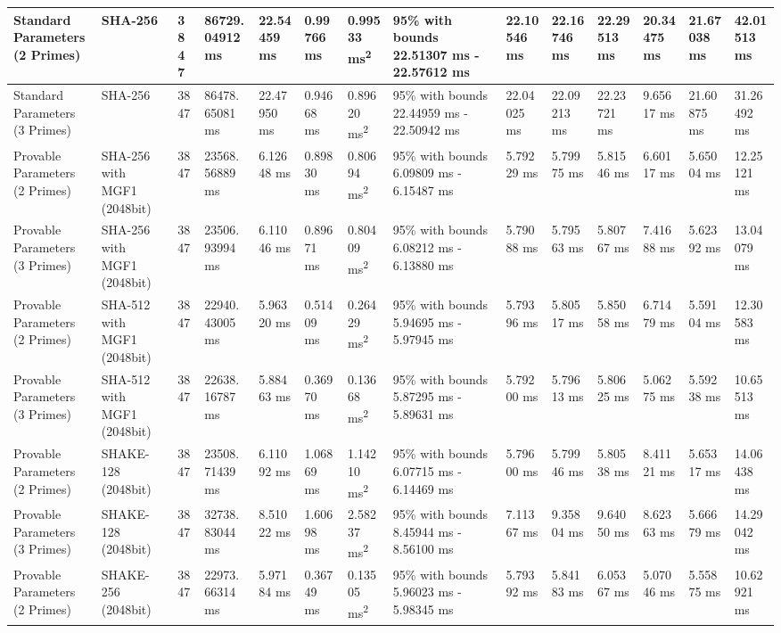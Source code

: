 \documentclass[]{final_report}
\theoremstyle{definition}
\begin{document}
\begin{landscape}
\begin{longtable}{|p{2.3cm}|p{1.8cm}|p{1.0cm}|p{1.7cm}|p{1.4cm}|p{1.5cm}|p{1.8cm}|p{1.5cm}|p{1.43cm}|p{1.5cm}|p{1.3cm}|p{1.4cm}|p{1.3cm}|p{1.3cm}|}
\hline
\endlastfoot
Standard Parameters (2 Primes) & SHA-256 & 3847 & 86729.
04912 ms & 22.54459 ms & 0.99766 ms & 0.99533 ms\textsuperscript{2} & 95\% with bounds 22.51307 ms - 22.57612 ms & 22.10546 ms & 22.16746 ms & 22.29513 ms & 20.34475 ms & 21.67038 ms & 42.01513 ms \\
\hline
Standard Parameters (3 Primes) & SHA-256 & 3847 & 86478.
65081 ms & 22.47950 ms & 0.94668 ms & 0.89620 ms\textsuperscript{2} & 95\% with bounds 22.44959 ms - 22.50942 ms & 22.04025 ms & 22.09213 ms & 22.23721 ms & 9.65617 ms & 21.60875 ms & 31.26492 ms \\
\hline
Provable Parameters (2 Primes) & SHA-256 with MGF1 (2048bit) & 3847 & 23568.
56889 ms & 6.12648 ms & 0.89830 ms & 0.80694 ms\textsuperscript{2} & 95\% with bounds 6.09809 ms - 6.15487 ms & 5.79229 ms & 5.79975 ms & 5.81546 ms & 6.60117 ms & 5.65004 ms & 12.25121 ms \\
\hline
Provable Parameters (3 Primes) & SHA-256 with MGF1 (2048bit) & 3847 & 23506.
93994 ms & 6.11046 ms & 0.89671 ms & 0.80409 ms\textsuperscript{2} & 95\% with bounds 6.08212 ms - 6.13880 ms & 5.79088 ms & 5.79563 ms & 5.80767 ms & 7.41688 ms & 5.62392 ms & 13.04079 ms \\
\hline
Provable Parameters (2 Primes) & SHA-512 with MGF1 (2048bit) & 3847 & 22940.
43005 ms & 5.96320 ms & 0.51409 ms & 0.26429 ms\textsuperscript{2} & 95\% with bounds 5.94695 ms - 5.97945 ms & 5.79396 ms & 5.80517 ms & 5.85058 ms & 6.71479 ms & 5.59104 ms & 12.30583 ms \\
\hline
Provable Parameters (3 Primes) & SHA-512 with MGF1 (2048bit) & 3847 & 22638.
16787 ms & 5.88463 ms & 0.36970 ms & 0.13668 ms\textsuperscript{2} & 95\% with bounds 5.87295 ms - 5.89631 ms & 5.79200 ms & 5.79613 ms & 5.80625 ms & 5.06275 ms & 5.59238 ms & 10.65513 ms \\
\hline
Provable Parameters (2 Primes) & SHAKE-128 (2048bit) & 3847 & 23508.
71439 ms & 6.11092 ms & 1.06869 ms & 1.14210 ms\textsuperscript{2} & 95\% with bounds 6.07715 ms - 6.14469 ms & 5.79600 ms & 5.79946 ms & 5.80538 ms & 8.41121 ms & 5.65317 ms & 14.06438 ms \\
\hline
Provable Parameters (3 Primes) & SHAKE-128 (2048bit) & 3847 & 32738.
83044 ms & 8.51022 ms & 1.60698 ms & 2.58237 ms\textsuperscript{2} & 95\% with bounds 8.45944 ms - 8.56100 ms & 7.11367 ms & 9.35804 ms & 9.64050 ms & 8.62363 ms & 5.66679 ms & 14.29042 ms \\
\hline
Provable Parameters (2 Primes) & SHAKE-256 (2048bit) & 3847 & 22973.
66314 ms & 5.97184 ms & 0.36749 ms & 0.13505 ms\textsuperscript{2} & 95\% with bounds 5.96023 ms - 5.98345 ms & 5.79392 ms & 5.84183 ms & 6.05367 ms & 5.07046 ms & 5.55875 ms & 10.62921 ms \\

\end{longtable}
\end{landscape}
\end{document}
